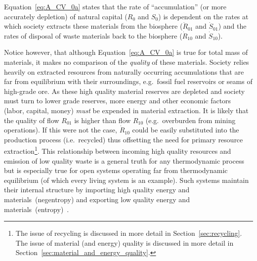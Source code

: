 
Equation~\ref{eq:A_CV_0a} states that the rate of ``accumulation'' 
(or more accurately depletion) of natural capital ($R_{0}$ and $S_{0}$) 
is dependent on the rates at which society extracts these materials
from the biosphere ($\dot{R}_{01}$ and $\dot{S}_{01}$) and the rates
of disposal of waste materials back to the biosphere ($\dot{R}_{10}$ 
and $\dot{S}_{10}$). 

Notice however, that although Equation~\ref{eq:A_CV_0a} is true for total mass of materials,
it makes no comparison of the \emph{quality} of these materials.
Society relies heavily on extracted resources from naturally
occurring accumulations that are far from equilibrium with their surroundings,
e.g.\ fossil fuel reservoirs or seams of high-grade ore. As these high quality
material reserves are depleted and society must turn to lower grade reserves, 
more energy and other economic factors (labor, capital, money) \emph{must} be 
expended  in material extraction.\cite{Mudd2010} It is likely that the quality
of flow $R_{01}$ is higher than flow $R_{10}$ 
(e.g.\ overburden from mining operations). 
If this were not the case,
$\dot{R}_{10}$ could be easily substituted 
into the production process (i.e.\ recycled) thus
offsetting the need for primary resource extraction\footnote{The
issue of recycling is discussed in more detail in 
Section~\ref{sec:recycling}.
The issue of material (and energy) quality 
is discussed in more detail in 
Section~\ref{sec:material_and_energy_quality}.}. 
This relationship between 
incoming high quality resources and emission of low
quality waste is a general truth 
for any thermodynamic process but is especially
true for open systems operating far from 
thermodynamic equilibrium 
(of which every living system is an example). 
Such systems maintain their internal structure by
importing high quality energy and 
materials~(negentropy) and exporting low quality
energy and materials~(entropy)~\cite{Schroedinger1947}.

